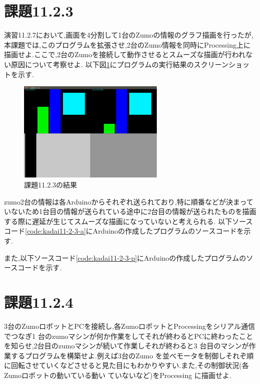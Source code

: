 \documentclass{jarticle}
\begin{document}
\section{課題11.2.3}
演習11.2.7において,画面を4分割して1台のZumoの情報のグラフ描画を行ったが,本課題では,このプログラムを拡張させ,2台のZumo情報を同時にProcessing上に描画せよ.ここで,2台のZumoを接続して動作させるとスムーズな描画が行われない原因について考察せよ. 
以下図\ref{fig:kadai11-2-3}にプログラムの実行結果のスクリーンショットを示す.  

\begin{figure}[H]
\begin{center}
\includegraphics[width=7.0cm]{images/11-2-3.png}
\caption{課題11.2.3の結果}
\label{fig:kadai11-2-3}
\end{center}
\end{figure}

zumo2台の情報は各Arduinoからそれぞれ送られており,特に順番などが決まっていないため1台目の情報が送られている途中に2台目の情報が送られたものを描画する際に遅延が生じてスムーズな描画になっていないと考えられる.
以下ソースコード\ref{code:kadai11-2-3-a}にArduinoの作成したプログラムのソースコードを示す.


また,以下ソースコード\ref{code:kadai11-2-3-p}にArduinoの作成したプログラムのソースコードを示す.


\section{課題11.2.4}
3台のZumoロボットとPCを接続し,各ZumoロボットとProcessingをシリアル通信でつなぎ1 台のzumoマシンが何か作業をしてそれが終わるとPCに終わったことを知らせ,2台目のzumoマシンが続いて作業しそれが終わると3 台目のマシンが作業するプログラムを構築せよ.例えば3台のZumo を並べモータを制御しそれぞ順に回転させていくなどさせると見た目にもわかりやすい.また,その制御状況(各Zumoロボットの動いている動い
ていないなど)をProcessing に描画せよ.
\end{document}

